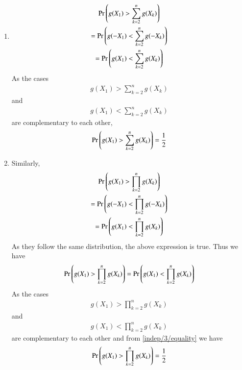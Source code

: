 \begin{enumerate}
\item 
\begin{multline}
    \Pr\left(g(X_1)>\sum_{k=2}^ng(X_k)\right)\\=
    \Pr\left(g(-X_1)<\sum_{k=2}^ng(-X_k)\right)\\=
    \Pr\left(g(X_1)<\sum_{k=2}^ng(X_k)\right)
\end{multline}
%
As the cases
\begin{align}
    g(X_1)>\sum_{k=2}^ng(X_k)
\end{align}
and
\begin{align}
    {g(X_1)<\sum_{k=2}^ng(X_k)}
\end{align}
are complementary to each other, 
\begin{align}\label{indep/3/sum}
 \Pr\left(g(X_1)>\sum_{k=2}^ng(X_k)\right)=\frac{1}{2}    
\end{align}
%
\item Similarly, 
\begin{multline}
    \Pr\left(g(X_1)>\prod_{k=2}^ng(X_k)\right)\\=
    \Pr\left(g(-X_1)<\prod_{k=2}^ng(-X_k)\right)\\=
    \Pr\left(g(X_1)<\prod_{k=2}^ng(X_k)\right)
\end{multline}
As they follow the same distribution, the above expression is true. Thus we have
\begin{align}
    \Pr\left(g(X_1)>\prod_{k=2}^ng(X_k)\right)=
    \Pr\left(g(X_1)<\prod_{k=2}^ng(X_k)\right)
\end{align}
%
As the cases
\begin{align}
    g(X_1)>\prod_{k=2}^ng(X_k)
\end{align}
and
\begin{align}
    {g(X_1)<\prod_{k=2}^ng(X_k)}
\end{align}
are complementary to each other and from 
 \eqref{indep/3/equality} we have
\begin{align}\label{indep/3/prod}
 \Pr\left(g(X_1)>\prod_{k=2}^ng(X_k)\right)=\frac{1}{2}    
\end{align}
\end{enumerate}

